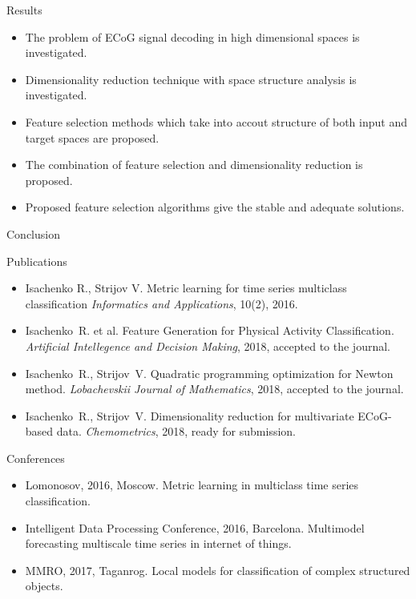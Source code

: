 \documentclass[9pt]{beamer}
\begin{document}
\begin{frame}{Results}
\begin{itemize}
	\item The problem of ECoG signal decoding in high dimensional spaces is investigated.
	\vfill
	\item Dimensionality reduction technique with space structure analysis is investigated.
	\vfill
	\item Feature selection methods which take into accout structure of both input and target spaces are proposed.
	\vfill
	\item The combination of feature selection and dimensionality reduction is proposed.
	\vfill
	\item Proposed feature selection algorithms give the stable and adequate solutions.
\end{itemize}
\end{frame}
\begin{frame}{Conclusion}
\begin{block}{Publications}
\vspace{-0.1cm}
\begin{itemize}
	\item Isachenko R., Strijov V. Metric learning for time series multiclass classification \emph{Informatics and Applications}, 10(2), 2016.
	\item Isachenko~R. et al. Feature Generation for Physical Activity Classification. \emph{Artificial Intellegence and Decision Making}, 2018, accepted to the journal.
	\item Isachenko~R., Strijov~V. Quadratic programming optimization for Newton method. \emph{Lobachevskii Journal of Mathematics}, 2018, accepted to the journal.
	\item Isachenko~R., Strijov~V. Dimensionality reduction for multivariate ECoG-based data. \emph{Chemometrics}, 2018, ready for submission.
\end{itemize}
\end{block}
\vspace{-0.1cm}
\begin{block}{Conferences}
\vspace{-0.2cm}
\begin{itemize}
	\item Lomonosov, 2016, Moscow. Metric learning in multiclass time series classification.
	\item Intelligent Data Processing Conference, 2016, Barcelona. Multimodel forecasting multiscale time series in internet of things.
	\item MMRO, 2017, Taganrog. Local models for classification of complex structured objects.
\end{itemize}
\end{block}
\end{frame}
\end{document}
